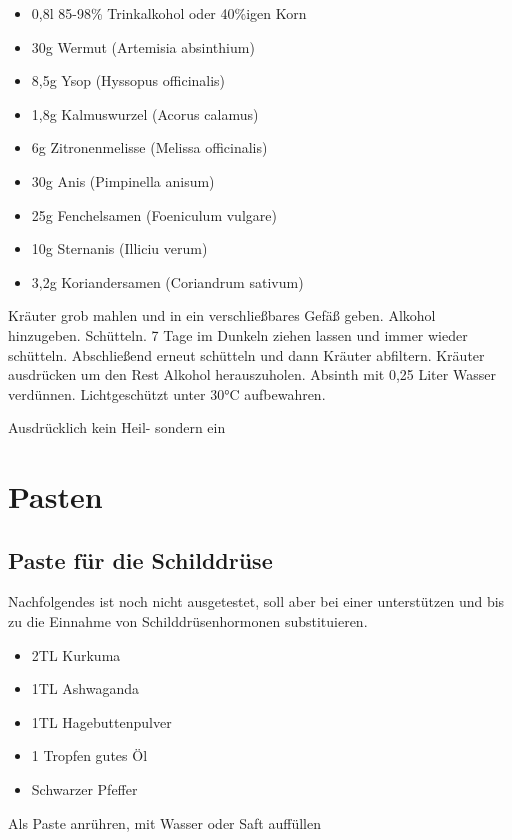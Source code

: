 \begin{itemize}
	\item 0,8l 85-98\% Trinkalkohol oder 40\%igen Korn
	\item 30g Wermut (Artemisia absinthium)
	\item 8,5g Ysop (Hyssopus officinalis)
	\item 1,8g Kalmuswurzel (Acorus calamus)
	\item 6g Zitronenmelisse (Melissa officinalis)
	\item 30g Anis (Pimpinella anisum)
	\item 25g Fenchelsamen (Foeniculum vulgare)
	\item 10g Sternanis (Illiciu verum)
	\item 3,2g Koriandersamen (Coriandrum sativum)
\end{itemize}

Kräuter grob mahlen und in ein verschließbares Gefäß geben.
Alkohol hinzugeben.
Schütteln.
7 Tage im Dunkeln ziehen lassen und immer wieder schütteln.
Abschließend erneut schütteln und dann Kräuter abfiltern.
Kräuter ausdrücken um den Rest Alkohol herauszuholen.
Absinth mit 0,25 Liter Wasser verdünnen.
Lichtgeschützt unter 30°C aufbewahren.


Ausdrücklich kein Heil- sondern ein 



\section{Pasten}

\subsection{Paste für die Schilddrüse}
 
Nachfolgendes ist noch nicht ausgetestet, soll aber bei einer  unterstützen und bis zu die Einnahme von Schilddrüsenhormonen substituieren.

\begin{itemize}
	\item 2TL Kurkuma
	\item 1TL Ashwaganda
	\item 1TL Hagebuttenpulver
	\item 1 Tropfen gutes Öl
	\item Schwarzer Pfeffer
\end{itemize}

Als Paste anrühren, mit Wasser oder Saft auffüllen



